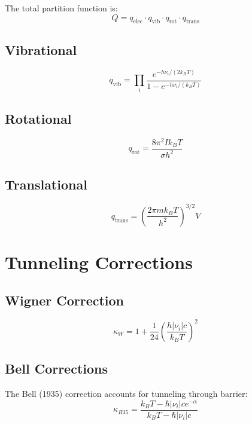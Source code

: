 \documentclass[11pt,a4paper]{book}
\begin{document}
The total partition function is:
\begin{equation}
Q = q_{\text{elec}} \cdot q_{\text{vib}} \cdot q_{\text{rot}} \cdot q_{\text{trans}}
\end{equation}

\subsection{Vibrational}
\begin{equation}
q_{\text{vib}} = \prod_i \frac{e^{-h\nu_i/(2k_B T)}}{1 - e^{-h\nu_i/(k_B T)}}
\end{equation}

\subsection{Rotational}
\begin{equation}
q_{\text{rot}} = \frac{8\pi^2 I k_B T}{\sigma h^2}
\end{equation}

\subsection{Translational}
\begin{equation}
q_{\text{trans}} = \left(\frac{2\pi m k_B T}{h^2}\right)^{3/2} V
\end{equation}

\section{Tunneling Corrections}

\subsection{Wigner Correction}
\begin{equation}
\kappa_W = 1 + \frac{1}{24}\left(\frac{h|\nu_i|c}{k_B T}\right)^2
\end{equation}

\subsection{Bell Corrections}

The Bell (1935) correction accounts for tunneling through barrier:
\begin{equation}
\kappa_{B35} = \frac{k_B T - \hbar|\nu_i|c e^{-\alpha}}{k_B T - \hbar|\nu_i|c}
\end{equation}
\end{document}
